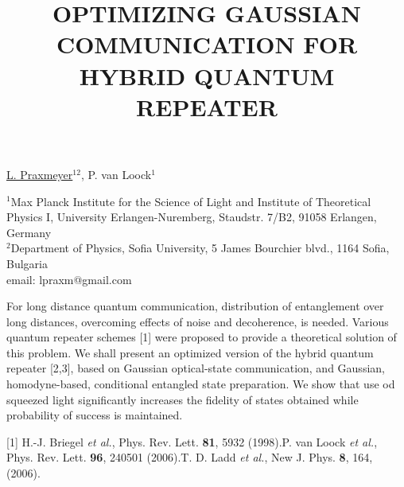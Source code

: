 \title{OPTIMIZING GAUSSIAN COMMUNICATION FOR HYBRID QUANTUM REPEATER}

\underline{L. Praxmeyer}$^{12}$, P. van Loock$^1$


$^1$Max Planck Institute for the Science of Light
and Institute of Theoretical Physics I,
University Erlangen-Nuremberg,
Staudstr. 7/B2, 91058 Erlangen, Germany \\
$^2$Department of Physics, Sofia University, 5 James Bourchier blvd., 1164 Sofia, Bulgaria\\
email: lpraxm@gmail.com

For long distance quantum communication, distribution of entanglement over long distances, overcoming effects of noise and decoherence, is needed. Various quantum repeater schemes [1] were proposed to provide a theoretical solution of this problem. We shall present an optimized version of the hybrid quantum repeater [2,3], based on Gaussian optical-state communication, and Gaussian, homodyne-based, conditional entangled state preparation. We show that use od squeezed light significantly increases the fidelity of states obtained while probability of success is maintained.

[1] H.-J. Briegel {\sl et al.}, Phys. Rev. Lett. \textbf{81}, 5932 (1998).\newline
[2] P. van Loock {\sl et al.}, Phys. Rev. Lett. \textbf{96}, 240501 (2006).\newline
[3] T. D. Ladd {\sl et al.}, New J. Phys. \textbf{8}, 164, (2006).

\vspace{\baselineskip}